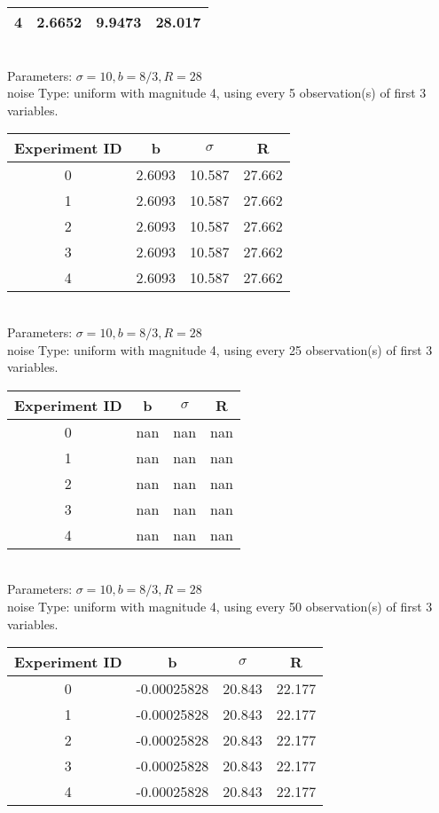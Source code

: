 \begin{multicols}{3}
\begin{tabular}{cccc}
 4 & 2.6652 & 9.9473 & 28.017\\ \hline 
 \end{tabular}\\
Parameters: $\sigma=10, b=8/3, R=28$\\
noise Type: uniform with magnitude 4, using every 5 observation(s) of first 3 variables.\\
\begin{tabular}{cccc}
\hline Experiment ID & b & $\sigma$ & R \\ \hline 
0 & 2.6093 & 10.587 & 27.662\\ \hline 
 1 & 2.6093 & 10.587 & 27.662\\ \hline 
 2 & 2.6093 & 10.587 & 27.662\\ \hline 
 3 & 2.6093 & 10.587 & 27.662\\ \hline 
 4 & 2.6093 & 10.587 & 27.662\\ \hline 
 \end{tabular}\\
Parameters: $\sigma=10, b=8/3, R=28$\\
noise Type: uniform with magnitude 4, using every 25 observation(s) of first 3 variables.\\
\begin{tabular}{cccc}
\hline Experiment ID & b & $\sigma$ & R \\ \hline 
0 & nan & nan & nan\\ \hline 
 1 & nan & nan & nan\\ \hline 
 2 & nan & nan & nan\\ \hline 
 3 & nan & nan & nan\\ \hline 
 4 & nan & nan & nan\\ \hline 
 \end{tabular}\\
Parameters: $\sigma=10, b=8/3, R=28$\\
noise Type: uniform with magnitude 4, using every 50 observation(s) of first 3 variables.\\
\begin{tabular}{cccc}
\hline Experiment ID & b & $\sigma$ & R \\ \hline 
0 & -0.00025828 & 20.843 & 22.177\\ \hline 
 1 & -0.00025828 & 20.843 & 22.177\\ \hline 
 2 & -0.00025828 & 20.843 & 22.177\\ \hline 
 3 & -0.00025828 & 20.843 & 22.177\\ \hline 
 4 & -0.00025828 & 20.843 & 22.177\\ \hline 

\end{tabular}
\end{multicols}
